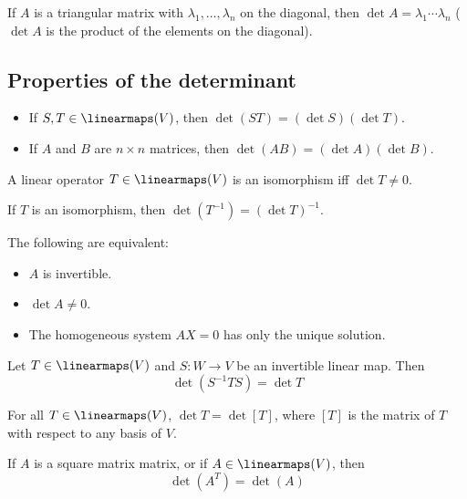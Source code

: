 \begin{lemma}
  If $A$ is a triangular matrix with $\lambda_1, \ldots, \lambda_n$ on the diagonal, then $\det A = \lambda_1 \cdots \lambda_n$ ($\det A$ is the product of the elements on the diagonal).
\end{lemma}

\subsection{Properties of the determinant}

\begin{theorem}
  \begin{itemize}
    \item If $S, T \in \linearmaps(V)$, then $\det(ST) = (\det S)(\det T)$.
    \item If $A$ and $B$ are $n \times n$ matrices, then $\det(AB) = (\det A)(\det B)$.
  \end{itemize}
\end{theorem}

\begin{theorem}
  A linear operator $T \in \linearmaps(V)$ is an isomorphism iff $\det T \neq 0$.

  If $T$ is an isomorphism, then $\det(T^{-1}) = (\det T)^{-1}$.
\end{theorem}

\begin{theorem}
  The following are equivalent:
  \begin{itemize}
    \item $A$ is invertible.
    \item $\det A \neq 0$.
    \item The homogeneous system $AX = 0$ has only the unique solution.
  \end{itemize}
\end{theorem}

\begin{theorem}
  Let $T \in \linearmaps(V)$ and $S : W \to V$ be an invertible linear map. Then
  \[
    \det(S^{-1} T S) = \det T
  \]
\end{theorem}

\begin{theorem}
  For all $T \in \linearmaps(V)$, $\det T = \det [T]$, where $[T]$ is the matrix of $T$ with respect to any basis of $V$.
\end{theorem}

\begin{theorem}
  If $A$ is a square matrix matrix, or if $A \in \linearmaps(V)$, then
  \[
    \det(A^T) = \det(A)
  \]
\end{theorem}

